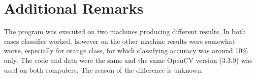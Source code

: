 \documentclass[a4paper, 11pt]{article}
\begin{document}
\section*{Additional Remarks}
The program was executed on two machines producing different results. In both cases classifier worked, however on the other machine results were somewhat worse, especially for orange class, for which classifying accuracy was around 10\% only. The code and data were the same and the same OpenCV version (3.3.0) was used on both computers. The reason of the difference is unknown.
\end{document}
